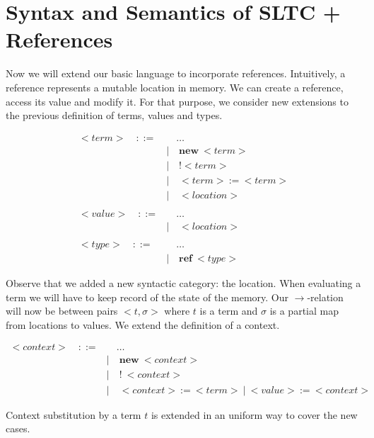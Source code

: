 
\section{Syntax and Semantics of SLTC + References}

Now we will extend our basic language to incorporate references. Intuitively, a reference represents a mutable location in memory. We can create a reference, access its value and modify it. For that purpose, we consider new extensions to the previous definition of terms, values and types. %

\begin{align*}
{<}term{>} \quad ::= & \quad \ldots \\
			       &| \quad \mathbf{new} \ {<}term{>} \tag{creation} \\
			       &| \quad \mathbf{!} {<}term{>} \tag{dereference}\\
			       &| \quad {<}term{>}   \ \textbf{:=}  \ {<}term{>} \tag{assignment}\\
			       &| \quad {<}location{>} \tag{location}\\		
\\
{<}value{>} \quad ::= & \quad \ldots \\
				&|  \quad {<}location{>}\\
\\
{<}type{>} \quad::= & \quad \ldots \\
			      &| \quad \mathbf{ref}  \ {<}type{>} \tag{reference type}
\end{align*}

Observe that we added a new syntactic category: the location. When evaluating a term we will have to keep record of the state of the memory.  Our $\to$-relation will now be between pairs ${<} t, \sigma{>}$ where $t$ is a term and $\sigma$ is a partial map from locations to values. We extend the definition of a context. 

\begin{align*}
{<}context{>} \quad ::= & \quad \ldots \\
				   &| \quad \mathbf{new}  \ {<}context{>} \\
				   &| \quad \mathbf{!} \ {<}context{>}\\
				   &| \quad {<}context{>} \ \textbf{:=} \ {<}term{>} \ | \  {<}value{>} \ \textbf{:=} \ {<}context{>}
\end{align*}

Context substitution by a term $t$ is extended in an uniform way to cover the new cases. 

